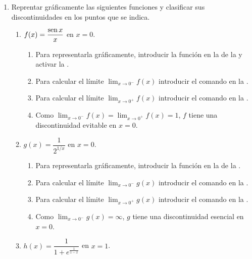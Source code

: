 \begin{enumerate}[leftmargin=*]
\item Reprentar gráficamente las siguientes funciones y clasificar sus discontinuidades en los puntos que se indica.
      \begin{enumerate}
      \item  $f(x)=\dfrac{\operatorname{sen} x}{x}$ en $x=0$.

            \begin{indication}
            \begin{enumerate}
            \item Para representarla gráficamente, introducir la función  en la  de la  y activar la .
            \item Para calcular el límite $\lim_{x\rightarrow 0^-}f(x)$ introducir el comando  en la .
            \item Para calcular el límite $\lim_{x\rightarrow 0^+}f(x)$ introducir el comando  en la .
            \item Como $\lim_{x\rightarrow 0^-}f(x)=\lim_{x\rightarrow 0^+}f(x)=1$, $f$ tiene una discontinuidad evitable en $x=0$.
            \end{enumerate}
            \end{indication}
      \item $g(x)=\dfrac{1}{2^{1/x}}$ en $x=0$.
            \begin{indication}
            \begin{enumerate}
            \item Para representarla gráficamente, introducir la función  en la  de la .
            \item Para calcular el límite $\lim_{x\rightarrow 0^-}g(x)$ introducir el comando  en la .
            \item Para calcular el límite $\lim_{x\rightarrow 0^+}g(x)$ introducir el comando  en la .
            \item Como $\lim_{x\rightarrow 0^-}g(x)=\infty$, $g$ tiene una discontinuidad esencial en $x=0$.
            \end{enumerate}
            \end{indication}
      \item $h(x)=\dfrac{1}{1+e^{\frac{1}{1-x}}}$ en $x=1$.

\end{enumerate}
\end{enumerate}
